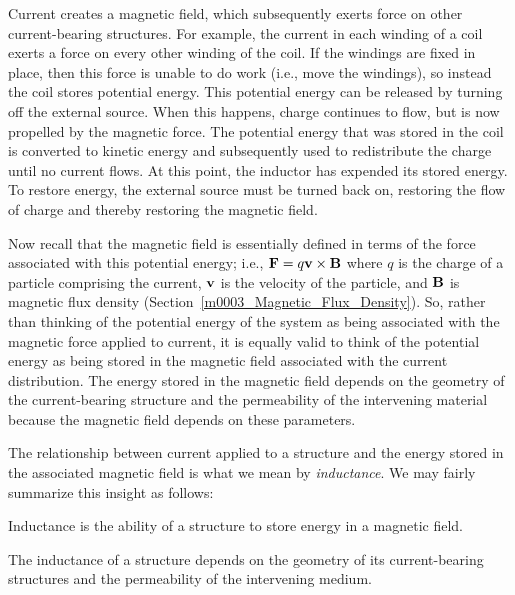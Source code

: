 

\label{m0123_Inductance} %

Current creates a magnetic field, which subsequently exerts force on other current-bearing structures.
For example, the current in each winding of a coil exerts a force on every other winding of the coil.
If the windings are fixed in place, then this force is unable to do work (i.e., move the windings), so instead the coil stores potential energy.
This potential energy can be released by turning off the external source.
When this happens, charge continues to flow, but is now propelled by the magnetic force.  
The potential energy that was stored in the coil is converted to kinetic energy and subsequently used to redistribute the charge until no current flows.
At this point, the inductor has expended its stored energy.
To restore energy, the external source must be turned back on, restoring the flow of charge and thereby restoring the magnetic field.
 
Now recall that the magnetic field is essentially defined in terms of the force associated with this potential energy; i.e., ${\bf F} = q{\bf v} \times {\bf B}$ where $q$ is the charge of a particle comprising the current, ${\bf v}$ is the velocity of the particle, and ${\bf B}$ is magnetic flux density (Section~\ref{m0003_Magnetic_Flux_Density}).
So, rather than thinking of the potential energy of the system as being associated with the magnetic force applied to current, it is equally valid to think of the potential energy as being stored in the magnetic field associated with the current distribution.
The energy stored in the magnetic field depends on the geometry of the current-bearing structure and the permeability of the intervening material because the magnetic field depends on these parameters. 

The relationship between current applied to a structure and the energy stored in the associated magnetic field is what we mean by \emph{inductance}.
We may fairly summarize this insight as follows:
%
\begin{mdframed}[backgroundcolor=yellow!20,nobreak=true] 
Inductance 
is the ability of a structure to store energy in a magnetic field.
\end{mdframed}
%
\begin{mdframed}[backgroundcolor=yellow!20,nobreak=true] 
The inductance of a structure depends on the geometry of its current-bearing structures and the permeability of the intervening medium.
\end{mdframed}

